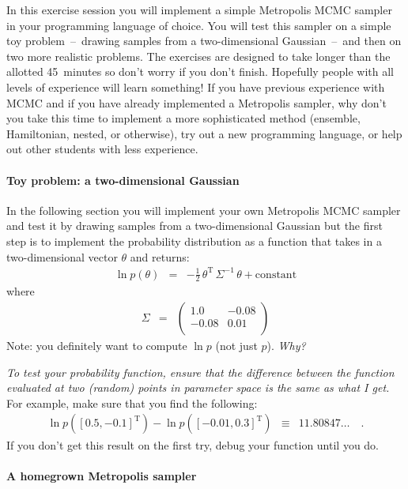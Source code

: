 \documentclass[letterpaper,12pt,preprint]{hack_aastex}
\newcommand{\question}{\emph}
\begin{document}
In this exercise session you will implement a simple Metropolis MCMC sampler
in your programming language of choice.
You will test this sampler on a simple toy problem~--~drawing samples from a
two-dimensional Gaussian~--~and then on two more realistic problems.
The exercises are designed to take longer than the allotted 45~minutes so
don't worry if you don't finish.
Hopefully people with all levels of experience will learn something!
If you have previous experience with MCMC and if you have already implemented
a Metropolis sampler, why don't you take this time to implement a more
sophisticated method (ensemble, Hamiltonian, nested, or otherwise), try out a
new programming language, or help out other students with less experience.

\paragraph{Toy problem: a two-dimensional Gaussian}

In the following section you will implement your own Metropolis MCMC sampler
and test it by drawing samples from a two-dimensional Gaussian but the first
step is to implement the probability distribution as a function that takes in
a two-dimensional vector $\theta$ and returns:
\begin{eqnarray}
\ln p(\theta) &=& -\frac{1}{2}\,\theta^\mathrm{T}\,\Sigma^{-1}\,\theta
    + \mathrm{constant}
\end{eqnarray}
where
\begin{eqnarray}
\Sigma &=& \left(\begin{array}{cc}
1.0 & -0.08 \\
-0.08 & 0.01 \\
\end{array}\right)
\end{eqnarray}
Note: you definitely want to compute $\ln p$ (not just $p$).
\question{Why?}

\question{To test your probability function, ensure that the difference
between the function evaluated at two (random) points in parameter space is
the same as what I get.}
For example, make sure that you find the following:
\begin{eqnarray}
\ln p([0.5, -0.1]^\mathrm{T}) - \ln p([-0.01, 0.3]^\mathrm{T}) &\equiv&
    11.80847\ldots \quad.
\end{eqnarray}
If you don't get this result on the first try, debug your function until you
do.

\paragraph{A homegrown Metropolis sampler}
\end{document}
